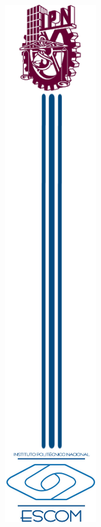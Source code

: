 
\thispagestyle{empty}	%

\begin{minipage}{.15\linewidth}	%
\includegraphics[scale=1]{./Figuras/Portada/Bannerizquierdo}
\end{minipage}
